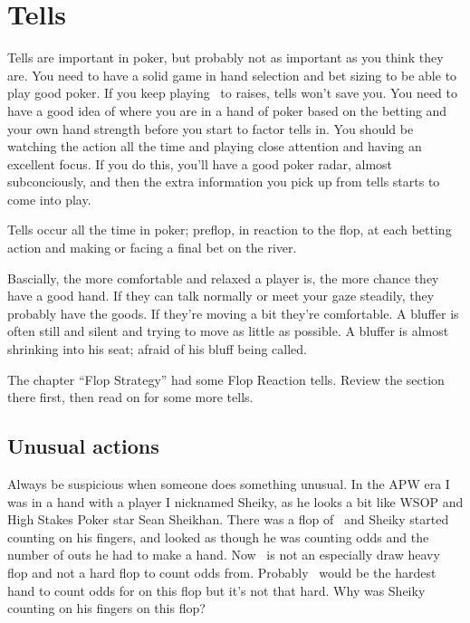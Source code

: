 \chapter{Tells}


Tells are important in poker, but probably not as important as you think
they are. You need to have a solid game in hand selection and bet sizing
to be able to play good poker. If you keep playing \Jh\sixc\ to
raises, tells won't save you. You need to have a good idea of where
you are in a hand of poker based on the betting and your own hand
strength before you start to factor tells in. You should be watching
the action all the time and playing close attention and having an
excellent focus. If you do this, you'll have a good poker radar,
almost subconciously, and then the extra information you pick up from
tells starts to come into play.

Tells occur all the time in poker; preflop, in reaction to the flop,
at each betting action and making or facing a final bet on the river.

Bascially, the more comfortable and relaxed a player is, the more
chance they have a good hand. If they can talk normally or meet your
gaze steadily, they probably have the goods. If they're moving a bit
they're comfortable. A bluffer is often still and silent and trying to
move as little as possible. A bluffer is almost shrinking into his
seat; afraid of his bluff being called.

The chapter ``Flop Strategy'' had some Flop Reaction tells. 
Review the section there first, then read on for some more tells.

\section{Unusual actions}

Always be suspicious when someone does something unusual.
In the APW era I was in a hand with a player I nicknamed Sheiky, as
he looks a bit like WSOP and High Stakes Poker star Sean Sheikhan.
There was a flop of \Kc\nined\sevd\, and Sheiky started counting on his
fingers, and looked as though he was counting odds and the number
of outs he had to make a hand. Now \Kc\nined\sevd\ is not an especially
draw heavy flop and not a hard flop to count odds from. Probably
\Qd\tens\ would be the hardest hand to count odds for on this flop but
it's not that hard. Why was Sheiky counting on his fingers on this
flop?

